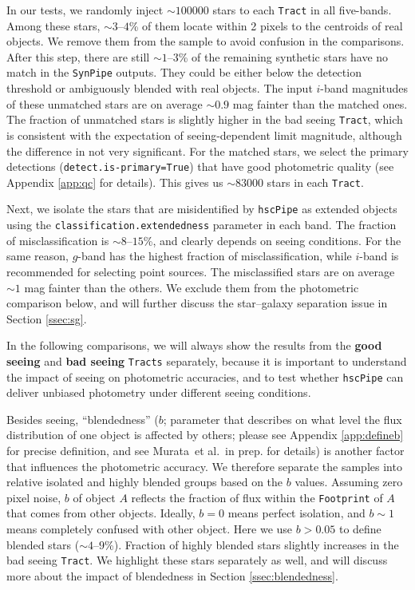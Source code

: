 \documentclass[useamsfonts]{pasj01}
\def\etal{{\ et al.~}}
\def\hscpipe{\texttt{hscPipe}}
\def\synpipe{\texttt{SynPipe}}
\def\tract{\texttt{Tract}}
\def\tracts{\texttt{Tracts}}
\begin{document}
    In our tests, we randomly inject ${\sim}100000$ stars to each \tract{} in all 
    five-bands. 
    Among these stars, ${\sim}3$--$4$\% of them locate within 2 pixels to the centroids
    of real objects. 
    We remove them from the sample to avoid confusion in the comparisons. 
    After this step, there are still ${\sim}1$--$3$\% of the remaining synthetic stars 
    have no match in the \synpipe{} outputs. 
    They could be either below the detection threshold or ambiguously blended with real
    objects. 
    The input $i$-band magnitudes of these unmatched stars are on average ${\sim}0.9$
    mag fainter than the matched ones. 
    The fraction of unmatched stars is slightly higher in the bad seeing \tract{},
    which is consistent with the expectation of seeing-dependent limit magnitude,  
    although the difference in not very significant.     
    For the matched stars, we select the primary detections 
    (\texttt{detect.is-primary=True}) that have good photometric quality 
    (see Appendix \ref{app:qc} for details). 
    This gives us ${\sim}83000$ stars in each \tract{}.
    
    Next, we isolate the stars that are misidentified by \hscpipe{} as extended 
    objects using the \texttt{classification.extendedness} parameter in each band. 
    The fraction of misclassification is ${\sim}8$--$15$\%, and clearly depends on 
    seeing conditions. 
    For the same reason, $g$-band has the highest fraction of misclassification, 
    while $i$-band is recommended for selecting point sources.  
    The misclassified stars are on average ${\sim}1$ mag fainter than the others.
    We exclude them from the photometric comparison below, and will further discuss 
    the star--galaxy separation issue in Section \ref{ssec:sg}.
    
    In the following comparisons, we will always show the results from the 
    \textbf{good seeing} and \textbf{bad seeing} \tracts{} separately, because it 
    is important to understand the impact of seeing on photometric accuracies, 
    and to test whether \hscpipe{} can deliver unbiased photometry under different 
    seeing conditions. 
    
    Besides seeing, ``blendedness'' ($b$; parameter that describes on what level 
    the flux distribution of one object is affected by others; please see 
    Appendix \ref{app:defineb} for precise definition, and see Murata\etal in prep. 
    for details) is another factor that influences the photometric accuracy. 
    We therefore separate the samples into relative isolated and highly blended 
    groups based on the $b$ values. 
    Assuming zero pixel noise, $b$ of object $A$ reflects the fraction of flux 
    within the \texttt{Footprint} of $A$ that comes from other objects.  
    Ideally, $b=0$ means perfect isolation, and $b{\sim}1$ means completely 
    confused with other object. 
    Here we use $b>0.05$ to define blended stars (${\sim}4$--$9$\%). 
    Fraction of highly blended stars slightly increases in the bad seeing \tract{}. 
    We highlight these stars separately as well, and will discuss more about the 
    impact of blendedness in Section \ref{ssec:blendedness}.
           
\end{document}
